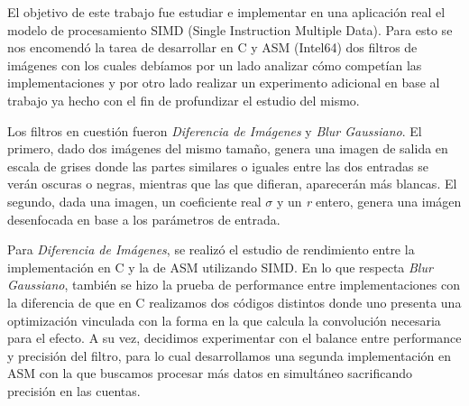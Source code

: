 El objetivo de este trabajo fue estudiar e implementar en una aplicación real el
modelo de procesamiento SIMD (Single Instruction Multiple Data). Para esto se
nos encomendó la tarea de desarrollar en C y ASM (Intel64) dos filtros de
imágenes con los cuales debíamos por un lado analizar cómo competían las
implementaciones y por otro lado realizar un experimento adicional en base al
trabajo ya hecho con el fin de profundizar el estudio del mismo.

Los filtros en cuestión fueron \textit{Diferencia de Imágenes} y \textit{Blur
Gaussiano}. El primero, dado dos imágenes del mismo tamaño, genera una imagen de salida
en escala de grises donde las partes similares o iguales entre las dos entradas
se verán oscuras o negras, mientras que las que difieran, aparecerán más
blancas. El segundo, dada una imagen, un coeficiente real $\sigma$ y un \textit{r}
entero, genera una imágen desenfocada en base a los parámetros de entrada.

Para \textit{Diferencia de Imágenes}, se realizó el estudio de rendimiento entre
la implementación en C y la de ASM utilizando SIMD. En lo que respecta
\textit{Blur Gaussiano}, también se hizo la prueba de performance entre
implementaciones con la diferencia de que en C realizamos dos códigos distintos
donde uno presenta una optimización vinculada con la forma en la que calcula
la convolución necesaria para el efecto. A su vez, decidimos experimentar con el
balance entre performance y precisión del filtro, para lo cual desarrollamos
una segunda implementación en ASM con la que buscamos procesar más datos en
simultáneo sacrificando precisión en las cuentas.
